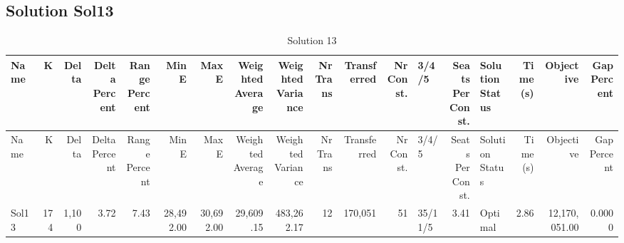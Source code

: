 \documentclass[a4paper]{article}
\begin{document}
\clearpage
\subsection{Solution Sol13}

{\scriptsize
\begin{longtable}{lrrrrrrrrrrrlrlrrr}
\caption{Solution 13}
\\ \toprule
Name &K &Delta &\shortstack{Delta\\Percent} &\shortstack{Range\\Percent} &Min E &Max E &\shortstack{Weighted\\Average} &\shortstack{Weighted\\Variance} &\shortstack{Nr\\Trans} &Transferred &\shortstack{Nr\\Const.} &3/4/5 &\shortstack{Seats\\Per\\Const.} &\shortstack{Solution\\Status} &\shortstack{Time\\(s)} &Objective &\shortstack{Gap\\Percent} \\ \midrule
\endfirsthead
\toprule
Name &K &Delta &\shortstack{Delta\\Percent} &\shortstack{Range\\Percent} &Min E &Max E &\shortstack{Weighted\\Average} &\shortstack{Weighted\\Variance} &\shortstack{Nr\\Trans} &Transferred &\shortstack{Nr\\Const.} &3/4/5 &\shortstack{Seats\\Per\\Const.} &\shortstack{Solution\\Status} &\shortstack{Time\\(s)} &Objective &\shortstack{Gap\\Percent} \\ \midrule
\endhead
\bottomrule
\endfoot
Sol13&174&1,100& 3.72& 7.43&28,492.00&30,692.00&29,609.15&483,262.17&12&170,051&51&35/11/5& 3.41&Optimal& 2.86&12,170,051.00&0.0000\\ 
\end{longtable}

}
\end{document}
